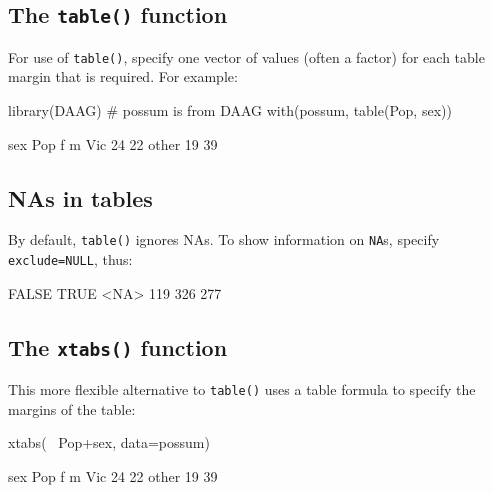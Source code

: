 \documentclass{tufte-book}\usepackage[]{graphicx}\usepackage[]{color}
\newcommand{\txtt}[1]{\texttt{#1}}
\begin{document}
\subsection*{The \texttt{table()} function}\label{ss:table}
For use of \txtt{table()}, specify one vector of values (often a
factor) for each table margin that is required.  For example:
\begin{Schunk}
\begin{Sinput}
library(DAAG)        # possum is from DAAG
with(possum, table(Pop, sex))
\end{Sinput}
\begin{Soutput}
       sex
Pop      f  m
  Vic   24 22
  other 19 39
\end{Soutput}
\end{Schunk}

\subsection*{NAs in tables}

By default, \txtt{table()} ignores NAs. To show information on
\txtt{NA}s, specify \txtt{exclude=NULL}, thus:
\begin{Schunk}
\begin{Soutput}

FALSE  TRUE  <NA> 
  119   326   277 
\end{Soutput}
\end{Schunk}


\subsection*{The \texttt{xtabs()} function}
This more flexible alternative to \txtt{table()} uses a table
formula to specify the margins of the table:
\begin{Schunk}
\begin{Sinput}
xtabs(~ Pop+sex, data=possum)
\end{Sinput}
\begin{Soutput}
       sex
Pop      f  m
  Vic   24 22
  other 19 39
\end{Soutput}
\end{Schunk}
\end{document}
